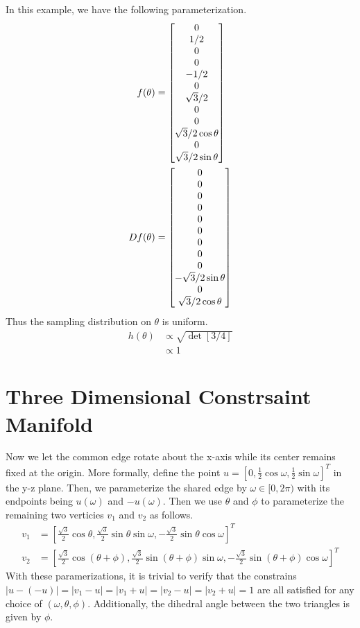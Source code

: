\documentclass[12pt]{article}
\newcommand*{\Scale}[2][4]{\scalebox{#1}{$#2$}}%
\begin{document}
In this example, we have the following parameterization. 
\begin{align}
f(\theta) &= \Scale[1.0]{\begin{bmatrix}
0 \\ 1/2 \\ 0 \\ 0 \\ -1/2 \\ 0 \\ \sqrt{3}/2 \\ 0 \\ 0 \\\sqrt{3}/2 \cos\theta \\ 0 \\ \sqrt{3}/2\sin\theta
\end{bmatrix}} \\
Df(\theta) &= \Scale[1.0]{\begin{bmatrix}
0 \\ 0 \\ 0 \\ 0 \\ 0 \\ 0 \\ 0 \\ 0 \\ 0 \\ -\sqrt{3}/2\sin\theta \\ 0 \\ \sqrt{3}/2\cos\theta
\end{bmatrix}} 
\end{align}
Thus the sampling distribution on $\theta$ is uniform. 
\begin{align}
h(\theta) &\propto \sqrt{\det\left[3/4\right]}\\
&\propto 1
\end{align}

\section{Three Dimensional Constrsaint Manifold}

Now we let the common edge rotate about the x-axis while its center remains fixed at the origin. More formally, define the point $u = \left[0, \frac{1}{2}\cos\omega, \frac{1}{2}\sin\omega\right]^T$ in the y-z plane. Then, we parameterize the shared edge by $\omega \in [0, 2\pi)$ with its endpoints being $u(\omega)$ and $-u(\omega)$. Then we use $\theta$ and $\phi$ to parameterize the remaining two verticies $v_1$ and $v_2$ as follows.
\begin{align}
v_1 &= \left[\frac{\sqrt{3}}{2}\cos\theta, \frac{\sqrt{3}}{2}\sin\theta\sin\omega, -\frac{\sqrt{3}}{2}\sin\theta\cos\omega\right]^T \\ 
v_2 &= \left[\frac{\sqrt{3}}{2}\cos(\theta+\phi), \frac{\sqrt{3}}{2}\sin(\theta+\phi)\sin\omega, -\frac{\sqrt{3}}{2}\sin(\theta+\phi)\cos\omega\right]^T 
\end{align}
With these paramerizations, it is trivial to verify that the constrains $|u - (-u)| = |v_1 - u| = |v_1 + u| =|v_2 - u| = |v_2 + u| = 1$ are all satisfied for any choice of $(\omega, \theta, \phi)$. Additionally, the dihedral angle between the two triangles is given by $\phi$. 
\end{document}
